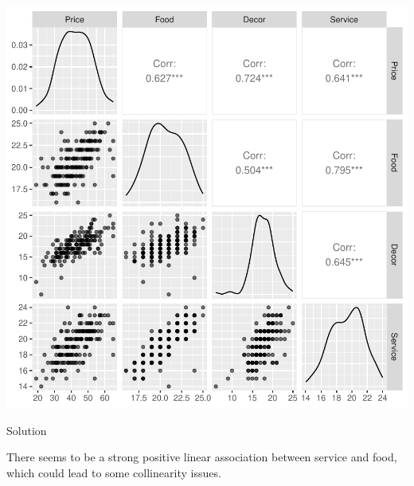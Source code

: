 \documentclass[
  letterpaper,
  DIV=11,
  numbers=noendperiod]{scrartcl}
\begin{document}
\begin{tcolorbox}
\begin{center}
\includegraphics{about_files/figure-pdf/unnamed-chunk-9-1.pdf}
\end{center}

Solution

There seems to be a strong positive linear association between service
and food, which could lead to some collinearity issues.

\end{tcolorbox}
\end{document}
